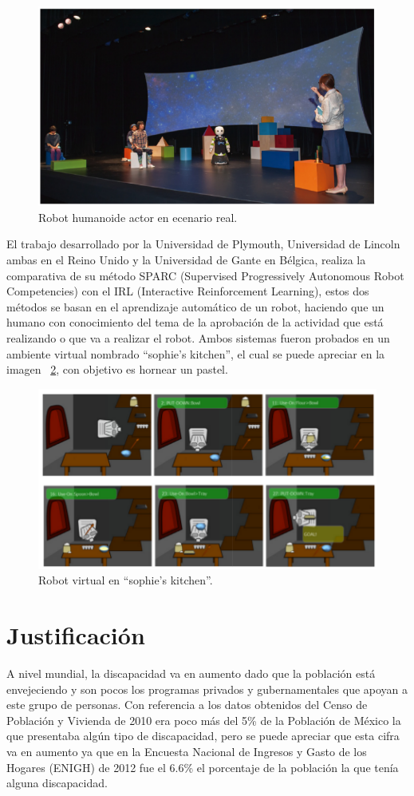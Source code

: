 \begin{figure}[H]
\centering
\includegraphics[width=0.8\columnwidth]{CapituloI/Imagenes/Theatrical.png}
\caption{Robot humanoide actor en ecenario real.}
\label{fig:theatricalrob}
\end{figure} 


El trabajo desarrollado por la Universidad de Plymouth, Universidad de Lincoln
 ambas en el Reino Unido y la Universidad de Gante en Bélgica\cite{Senft2016},
 realiza la comparativa de su método SPARC (Supervised Progressively Autonomous
 Robot Competencies) con el IRL (Interactive Reinforcement Learning), estos dos
 métodos se basan en el aprendizaje automático de un robot, haciendo que un
 humano con conocimiento del tema de la aprobación de la actividad que está
 realizando o que va a realizar el robot. Ambos sistemas fueron probados en un
 ambiente virtual nombrado “sophie’s kitchen”, el cual se puede apreciar en la
 imagen ~\ref{fig:sparcrob}, con objetivo es hornear un pastel.
 
 
\begin{figure}[H]
\centering
\includegraphics[width=0.8\columnwidth]{CapituloI/Imagenes/Sparc.png}
\caption{Robot virtual en “sophie’s kitchen”.}
\label{fig:sparcrob}
\end{figure}


\section{Justificación}
A nivel mundial, la discapacidad va en aumento dado que la población está
 envejeciendo y son pocos los programas privados y gubernamentales que apoyan a
 este grupo de personas\cite{OrganizacionMundialdelaSalud2011}. 
 Con referencia a los datos obtenidos del Censo de Población
 y Vivienda de 2010 era poco más del 5\% de la Población de México la que
 presentaba algún tipo de discapacidad, pero se puede apreciar que esta cifra va
 en aumento ya que en la Encuesta Nacional de Ingresos y Gasto de los Hogares
 (ENIGH) de 2012 fue el 6.6\% el porcentaje de la población la que tenía alguna
 discapacidad\cite{Milosavljevic2014}.
 

